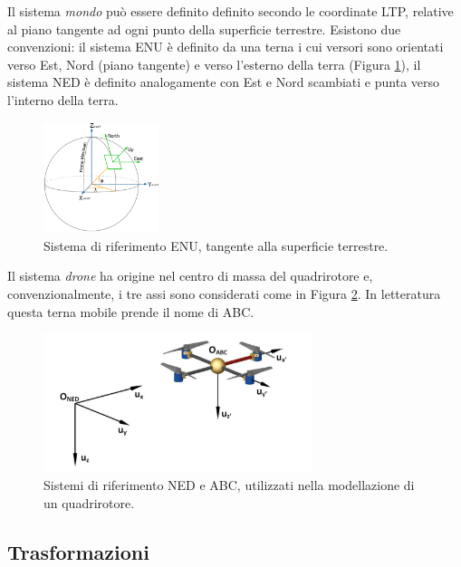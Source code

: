 Il sistema \emph{mondo} può essere definito definito secondo le coordinate \ac{LTP}, relative al piano tangente ad ogni punto della superficie terrestre. Esistono due convenzioni: il sistema \ac{ENU} è definito da una terna i cui versori sono orientati verso Est, Nord (piano tangente) e verso l'esterno della terra (Figura \ref{fig:fixedRef}), il sistema \ac{NED} è definito analogamente con Est e Nord scambiati e punta verso l'interno della terra.

\begin{figure}[H]
    \centering
    \includegraphics[width=0.3\textwidth]{gfx/ltp_enu}
    \caption[Sistema di riferimento \acs{ENU}.]{Sistema di riferimento \acs{ENU}, tangente alla superficie terrestre.}
    \label{fig:fixedRef}
\end{figure}

Il sistema \emph{drone} ha origine nel centro di massa del quadrirotore e, convenzionalmente, i tre assi sono considerati come in Figura \ref{fig:abc_frame}. In letteratura questa terna mobile prende il nome di \ac{ABC}.

\begin{figure}[H]
    \centering
    \includegraphics[width=0.7\textwidth]{gfx/abc_frame}
    \caption[Sistemi di riferimento \acs{NED} e \acs{ABC}.]{Sistemi di riferimento \acs{NED} e \acs{ABC}, utilizzati nella modellazione di un quadrirotore.}
    \label{fig:abc_frame}
\end{figure}

\subsection{Trasformazioni}

